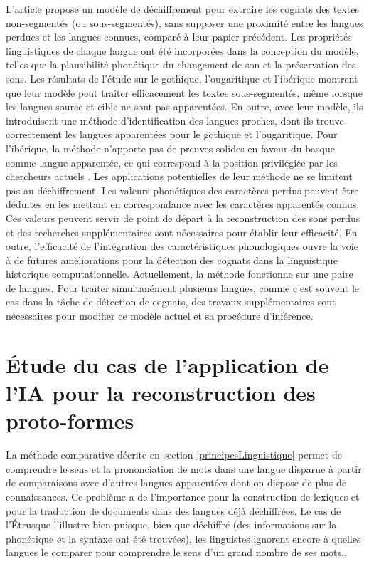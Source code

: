 \documentclass[12pt, french, twoside]{report}
\begin{document}
L'article propose un modèle de déchiffrement pour extraire les cognats des textes non-segmentés (ou sous-segmentés), sans supposer une proximité entre les langues perdues et les langues connues, comparé à leur papier précédent\citep{ugaritic-and-linear-B}. Les propriétés linguistiques de chaque langue ont été incorporées dans la conception du modèle, telles que la plausibilité phonétique du changement de son et la préservation des sons. Les résultats de l'étude sur le gothique, l'ougaritique et l'ibérique montrent que leur modèle peut traiter efficacement les textes sous-segmentés, même lorsque les langues source et cible ne sont pas apparentées. En outre, avec leur modèle, ils introduisent une méthode d'identification des langues proches, dont ils trouve correctement les langues apparentées pour le gothique et l'ougaritique. Pour l'ibérique, la méthode n'apporte pas de preuves solides en faveur du basque comme langue apparentée, ce qui correspond à la position privilégiée par les chercheurs actuels \citep{deepmind2022}. Les applications potentielles de leur méthode ne se limitent pas au déchiffrement. Les valeurs phonétiques des caractères perdus peuvent être déduites en les mettant en correspondance avec les caractères apparentés connus. Ces valeurs peuvent servir de point de départ à la reconstruction des sons perdus et des recherches supplémentaires sont nécessaires pour établir leur efficacité. En outre, l'efficacité de l'intégration des caractéristiques phonologiques ouvre la voie à de futures améliorations pour la détection des cognats dans la linguistique historique computationnelle. Actuellement, la méthode fonctionne sur une paire de langues. Pour traiter simultanément plusieurs langues, comme c'est souvent le cas dans la tâche de détection de cognats, des travaux supplémentaires sont nécessaires pour modifier ce modèle actuel et sa procédure d'inférence.\\

\chapter{Étude du cas de l'application de l'IA pour la reconstruction des proto-formes}
La méthode comparative décrite en section \ref{principesLinguistique} permet de comprendre le sens et la prononciation de mots dans une langue disparue à partir de comparaisons avec d'autres langues apparentées dont on dispose de plus de connaissances. Ce problème a de l'importance pour la construction de lexiques et pour la traduction de documents dans des langues déjà déchiffrées. Le cas de l'Étrusque l'illustre bien puisque, bien que déchiffré (des informations sur la phonétique et la syntaxe ont été trouvées), les linguistes ignorent encore à quelles langues le comparer pour comprendre le sens d'un grand nombre de ses mots.\citep{bnf_etrusque}.
\end{document}
